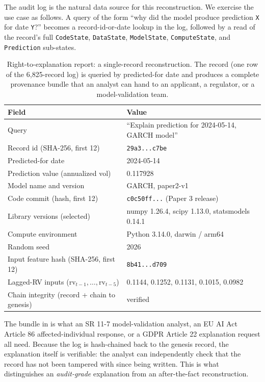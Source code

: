 The audit log is the natural data source for this reconstruction. We exercise the use case as follows. A query of the form ``why did the model produce prediction \texttt{X} for date \texttt{Y}?'' becomes a record-id-or-date lookup in the log, followed by a read of the record's full \texttt{CodeState}, \texttt{DataState}, \texttt{ModelState}, \texttt{ComputeState}, and \texttt{Prediction} sub-states.

\begin{table}[H]
\centering
\caption{Right-to-explanation report: a single-record reconstruction. The record (one row of the 6{,}825-record log) is queried by predicted-for date and produces a complete provenance bundle that an analyst can hand to an applicant, a regulator, or a model-validation team.}\label{tab:rte}
\footnotesize
\setlength{\tabcolsep}{4pt}
\begin{tabular}{@{}p{5.6cm}p{8.4cm}@{}}
\toprule
Field & Value \\
\midrule
Query & ``Explain prediction for 2024-05-14, GARCH model'' \\
Record id (SHA-256, first 12) & \texttt{29a3...c7be} \\
Predicted-for date & 2024-05-14 \\
Prediction value (annualized vol) & 0.117928 \\
Model name and version & GARCH, paper2-v1 \\
Code commit (hash, first 12) & \texttt{c0c50ff...} (Paper 3 release) \\
Library versions (selected) & numpy 1.26.4, scipy 1.13.0, statsmodels 0.14.1 \\
Compute environment & Python 3.14.0, darwin / arm64 \\
Random seed & 2026 \\
Input feature hash (SHA-256, first 12) & \texttt{8b41...d709} \\
Lagged-RV inputs ($\text{rv}_{t-1}, \ldots, \text{rv}_{t-5}$) & 0.1144, 0.1252, 0.1131, 0.1015, 0.0982 \\
Chain integrity (record + chain to genesis) & verified \\
\bottomrule
\end{tabular}
\end{table}

The bundle in  is what an SR 11-7 model-validation analyst, an EU AI Act Article 86 affected-individual response, or a GDPR Article 22 explanation request all need. Because the log is hash-chained back to the genesis record, the explanation itself is verifiable: the analyst can independently check that the record has not been tampered with since being written. This is what distinguishes an \emph{audit-grade} explanation from an after-the-fact reconstruction.

